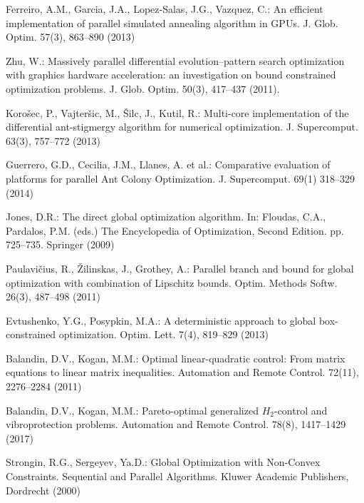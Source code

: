 \documentclass[smallextended]{svjour3}       %
\begin{document}
\begin{thebibliography}{}

Ferreiro, A.M., Garcia, J.A., Lopez-Salas, J.G., Vazquez, C.: An efficient implementation of parallel simulated annealing algorithm in GPUs. J. Glob. Optim. 57(3), 863--890 (2013)

Zhu, W.: Massively parallel differential evolution--pattern search optimization with graphics hardware acceleration: an investigation on bound constrained optimization problems. J. Glob. Optim. 50(3), 417--437 (2011).

Koro\v sec, P., Vajter\v sic, M.,  \v Silc, J., Kutil, R.: Multi-core implementation of the differential ant-stigmergy algorithm for numerical optimization. J. Supercomput. 63(3), 757--772 (2013)

Guerrero, G.D., Cecilia, J.M., Llanes, A. et al.: Comparative evaluation of platforms for parallel Ant Colony Optimization. J. Supercomput. 69(1) 318--329 (2014)

Jones, D.R.: The direct global optimization algorithm. In: Floudas, C.A., Pardalos, P.M. (eds.) The Encyclopedia of Optimization, Second Edition. pp. 725--735. Springer (2009)


Paulavi\v cius, R., \v Zilinskas, J., Grothey, A.: Parallel branch and bound for global optimization with combination of Lipschitz bounds. Optim. Methods Softw. 26(3), 487--498 (2011)

Evtushenko, Y.G., Posypkin, M.A.: A deterministic approach to global box-constrained optimization. Optim. Lett. 7(4), 819--829 (2013)

Balandin, D.V., Kogan, M.M.: Optimal linear-quadratic control: From matrix equations to linear matrix inequalities. Automation and Remote Control. 72(11), 2276--2284 (2011)

Balandin, D.V., Kogan, M.M.: Pareto-optimal generalized $H_2$-control and vibroprotection problems. Automation and Remote Control. 78(8), 1417--1429 (2017)

Strongin, R.G., Sergeyev, Ya.D.: Global Optimization with Non-Convex Constraints. Sequential and Parallel Algorithms. Kluwer Academic Publishers, Dordrecht (2000)


\end{thebibliography}
\end{document}
